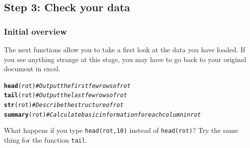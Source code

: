 \documentclass{article}\usepackage[]{graphicx}\usepackage[]{color}
\makeatletter
\newcommand{\hlcom}[1]{\textcolor[rgb]{0.678,0.584,0.686}{\textit{#1}}}%
\newcommand{\hlstd}[1]{\textcolor[rgb]{0.345,0.345,0.345}{#1}}%
\newcommand{\hlkwd}[1]{\textcolor[rgb]{0.737,0.353,0.396}{\textbf{#1}}}%
\newenvironment{kframe}{%
 \def\at@end@of@kframe{}%
 \ifinner\ifhmode%
  \def\at@end@of@kframe{\end{minipage}}%
  \begin{minipage}{\columnwidth}%
 \fi\fi%
 \def\FrameCommand##1{\hskip\@totalleftmargin \hskip-\fboxsep
 \colorbox{shadecolor}{##1}\hskip-\fboxsep
     \hskip-\linewidth \hskip-\@totalleftmargin \hskip\columnwidth}%
 \MakeFramed {\advance\hsize-\width
   \@totalleftmargin\z@ \linewidth\hsize
   \@setminipage}}%
 {\par\unskip\endMakeFramed%
 \at@end@of@kframe}
\newenvironment{knitrout}{}{} %
\makeatother
\begin{document}
\subsection{Step 3: Check your data}
\subsubsection{Initial overview}
The next functions allow you to take a first look at the data you have loaded. If you see anything strange at this stage, you may have to go back to your original document in excel.
\begin{knitrout}
\color{fgcolor}\begin{kframe}
\begin{alltt}
\hlkwd{head}\hlstd{(rot)} \hlcom{# Output the first few rows of rot}
\hlkwd{tail}\hlstd{(rot)} \hlcom{# Output the last few rows of rot}
\hlkwd{str}\hlstd{(rot)}  \hlcom{# Describe the structure of rot}
\hlkwd{summary}\hlstd{(rot)} \hlcom{# Calculate basic information for each column in rot}
\end{alltt}
\end{kframe}
\end{knitrout}
What happens if you type \texttt{head(rot,10)} instead of \texttt{head(rot)}? Try the same thing for the function \texttt{tail}.
\end{document}
